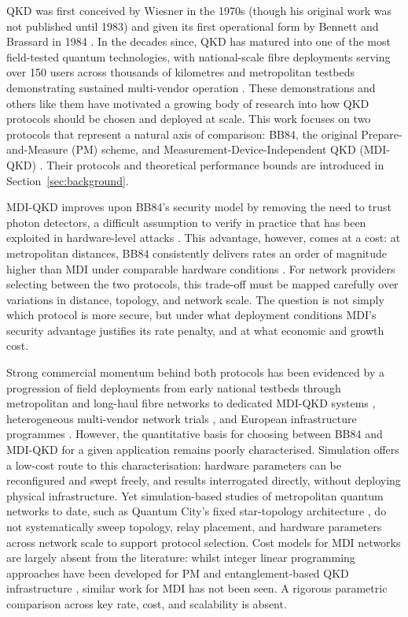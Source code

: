 \documentclass[12pt]{article}
\begin{document}
QKD was first conceived by Wiesner \cite{Wiesner_1983} in the 1970s (though his original work was not published until 1983) and given its first operational form by Bennett and Brassard in 1984 \cite{Bennett_2014}. In the decades since, QKD has matured into one of the most field-tested quantum technologies, with national-scale fibre deployments serving over 150 users across thousands of kilometres \cite{chen2021} and metropolitan testbeds demonstrating sustained multi-vendor operation \cite{Peev_2009,Sasaki_2011}. These demonstrations and others like them have motivated a growing body of research into how QKD protocols should be chosen and deployed at scale. This work focuses on two protocols that represent a natural axis of comparison: BB84, the original Prepare-and-Measure (PM) scheme, and Measurement-Device-Independent QKD (MDI-QKD) \cite{Lo_2012}. Their protocols and theoretical performance bounds are introduced in Section~\ref{sec:background}.

MDI-QKD improves upon BB84's security model by removing the need to trust photon detectors, a difficult assumption to verify in practice that has been exploited in hardware-level attacks \cite{Lydersen_2010,Makarov_2009,Gerhardt_2011}. This advantage, however, comes at a cost: at metropolitan distances, BB84 consistently delivers rates an order of magnitude higher than MDI under comparable hardware conditions \cite{Dynes_2019,Yan2025}. For network providers selecting between the two protocols, this trade-off must be mapped carefully over variations in distance, topology, and network scale. The question is not simply which protocol is more secure, but under what deployment conditions MDI's security advantage justifies its rate penalty, and at what economic and growth cost.

Strong commercial momentum behind both protocols has been evidenced by a progression of field deployments from early national testbeds \cite{Peev_2009,Sasaki_2011,chen2021,Qin_NQSN_2024} through metropolitan and long-haul fibre networks \cite{Dynes_2019,pittaluga_2024} to dedicated MDI-QKD systems \cite{Tang_2016,Berrevoets_2022,qbird_belQCI}, heterogeneous multi-vendor network trials \cite{Martins2024}, and European infrastructure programmes \cite{eu_open_qkd}. However, the quantitative basis for choosing between BB84 and MDI-QKD for a given application remains poorly characterised. Simulation offers a low-cost route to this characterisation: hardware parameters can be reconfigured and swept freely, and results interrogated directly, without deploying physical infrastructure. Yet simulation-based studies of metropolitan quantum networks to date, such as Quantum City's fixed star-topology architecture \cite{Yehia_2022}, do not systematically sweep topology, relay placement, and hardware parameters across network scale to support protocol selection. Cost models for MDI networks are largely absent from the literature: whilst integer linear programming approaches have been developed for PM and entanglement-based QKD infrastructure \cite{DBLP:conf/ondm/KaraviasHBLP25}, similar work for MDI has not been seen. A rigorous parametric comparison across key rate, cost, and scalability is absent.
\end{document}
